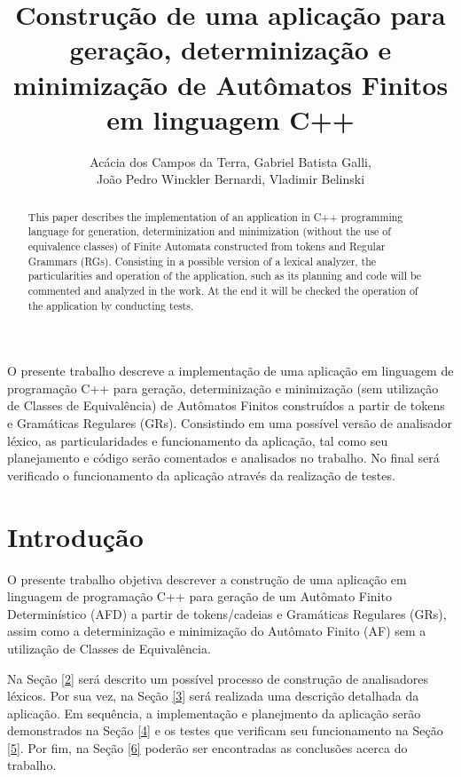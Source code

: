 \documentclass[12pt]{article}
\title{Construção de uma aplicação para geração, determinização e minimização de Autômatos Finitos em linguagem C++}
\author{Acácia dos Campos da Terra\inst{1}, Gabriel Batista Galli\inst{1},\\ João Pedro Winckler Bernardi\inst{1}, Vladimir Belinski\inst{1} }
\begin{document}
 

\maketitle

\begin{abstract}
 This paper describes the implementation of an application in C++ programming language for generation, determinization and minimization (without the use of equivalence classes) of Finite Automata constructed from tokens and Regular Grammars (RGs). Consisting in a possible version of a lexical analyzer, the particularities and operation of the application, such as its planning and code will be commented and analyzed in the work. At the end it will be checked the operation of the application by conducting tests.
\end{abstract}
     
\begin{resumo} 
 O presente trabalho descreve a implementação de uma aplicação em linguagem de programação C++ para geração, determinização e minimização (sem utilização de Classes de Equivalência) de Autômatos Finitos construídos a partir de tokens e Gramáticas Regulares (GRs). Consistindo em uma possível versão de analisador léxico, as particularidades e funcionamento da aplicação, tal como seu planejamento e código serão comentados e analisados no trabalho. No final será verificado o funcionamento da aplicação através da realização de testes.

\end{resumo}


\section{Introdução}

O presente trabalho objetiva descrever a construção de uma aplicação em linguagem de programação C++ para geração de um Autômato Finito Determinístico (AFD) a partir de tokens/cadeias e Gramáticas Regulares (GRs), assim como a determinização e minimização do Autômato Finito (AF) sem a utilização de Classes de Equivalência.

Na Seção \ref{2} será descrito um possível processo de construção de analisadores léxicos. Por sua vez, na Seção \ref{3} será realizada uma descrição detalhada da aplicação. Em sequência, a implementação e planejmento da aplicação serão demonstrados na Seção \ref{4} e os testes que verificam seu funcionamento na Seção \ref{5}. Por fim, na Seção \ref{6} poderão ser encontradas as conclusões acerca do trabalho.
\end{document}
